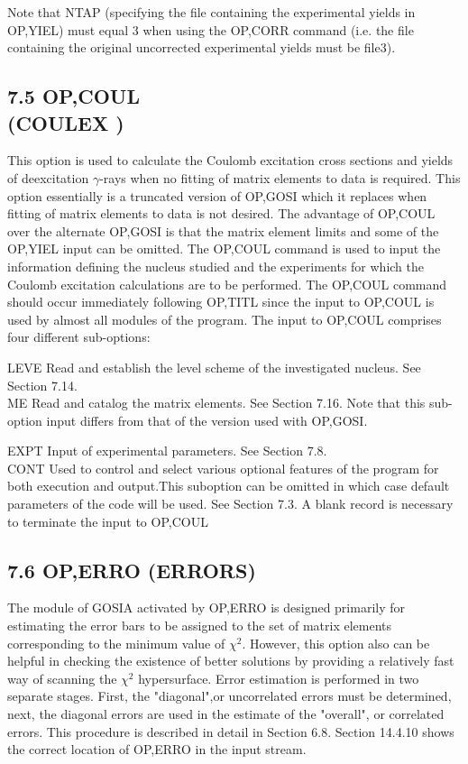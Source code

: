 \documentclass[10pt]{article}
\begin{document}
Note that NTAP (specifying the file containing the experimental yields in OP,YIEL) must equal 3 when using the OP,CORR command (i.e. the file containing the original uncorrected experimental yields must be file3).

\subsection*{7.5 OP,COUL \\
 (COULEX )}
This option is used to calculate the Coulomb excitation cross sections and yields of deexcitation $\gamma$-rays when no fitting of matrix elements to data is required. This option essentially is a truncated version of OP,GOSI which it replaces when fitting of matrix elements to data is not desired. The advantage of OP,COUL over the alternate OP,GOSI is that the matrix element limits and some of the OP,YIEL input can be omitted. The OP,COUL command is used to input the information defining the nucleus studied and the experiments for which the Coulomb excitation calculations are to be performed. The OP,COUL command should occur immediately following OP,TITL since the input to OP,COUL is used by almost all modules of the program. The input to OP,COUL comprises four different sub-options:

LEVE Read and establish the level scheme of the investigated nucleus. See Section 7.14.\\
ME Read and catalog the matrix elements. See Section 7.16. Note that this sub-option input differs from that of the version used with OP,GOSI.

EXPT Input of experimental parameters. See Section 7.8.\\
CONT Used to control and select various optional features of the program for both execution and output.This suboption can be omitted in which case default parameters of the code will be used. See Section 7.3. A blank record is necessary to terminate the input to OP,COUL

\subsection*{7.6 OP,ERRO (ERRORS)}
The module of GOSIA activated by OP,ERRO is designed primarily for estimating the error bars to be assigned to the set of matrix elements corresponding to the minimum value of $\chi^{2}$. However, this option also can be helpful in checking the existence of better solutions by providing a relatively fast way of scanning the $\chi^{2}$ hypersurface. Error estimation is performed in two separate stages. First, the "diagonal",or uncorrelated errors must be determined, next, the diagonal errors are used in the estimate of the "overall", or correlated errors. This procedure is described in detail in Section 6.8. Section 14.4.10 shows the correct location of OP,ERRO in the input stream.
\end{document}
